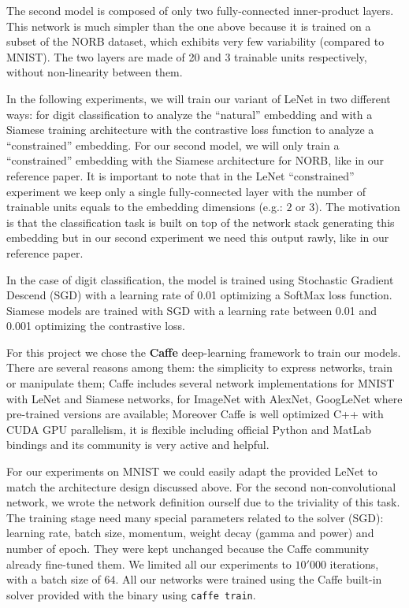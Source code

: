 \documentclass[a4paper,12pt]{report}
\newcommand{\eg}{e.g.}
\begin{document}
The second model is composed of only two fully-connected inner-product layers.
This network is much simpler than the one above because it is trained on a subset of the NORB dataset, which exhibits very few variability (compared to MNIST).
The two layers are made of 20 and 3 trainable units respectively, without non-linearity between them. %

In the following experiments, we will train our variant of LeNet in two different ways: for digit classification to analyze the ``natural'' embedding and with a Siamese training architecture with the contrastive loss function to analyze a ``constrained'' embedding.
For our second model, we will only train a ``constrained'' embedding with the Siamese architecture for NORB, like in our reference paper.
It is important to note that in the LeNet ``constrained'' experiment we keep only a single fully-connected layer with the number of trainable units equals to the embedding dimensions (\eg: $2$ or $3$).
The motivation is that the classification task is built on top of the network stack generating this embedding but in our second experiment we need this output rawly, like in our reference paper.

In the case of digit classification, the model is trained using Stochastic Gradient Descend (SGD) with a learning rate of 0.01 optimizing a SoftMax loss function.
Siamese models are trained with SGD with a learning rate between 0.01 and 0.001 optimizing the contrastive loss.

For this project we chose the {\bf Caffe} deep-learning framework to train our models.
There are several reasons among them: the simplicity to express networks, train or manipulate them; Caffe includes several network implementations for MNIST with LeNet and Siamese networks, for ImageNet with AlexNet, GoogLeNet where pre-trained versions are available; Moreover Caffe is well optimized C++ with CUDA GPU parallelism, it is flexible including official Python and MatLab bindings and its community is very active and helpful.

For our experiments on MNIST we could easily adapt the provided LeNet to match the architecture design discussed above.
For the second non-convolutional network, we wrote the network definition ourself due to the triviality of this task.
The training stage need many special parameters related to the solver (SGD): learning rate, batch size, momentum, weight decay (gamma and power) and number of epoch.
They were kept unchanged because the Caffe community already fine-tuned them.
We limited all our experiments to $10'000$ iterations, with a batch size of $64$.
All our networks were trained using the Caffe built-in solver provided with the binary using {\tt caffe train}.
\end{document}
